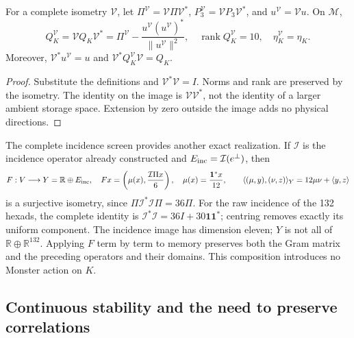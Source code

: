 \begin{proposition}
\label{lib01:transporte-direccion}
For a complete isometry \(\mathcal V\), let \(\Pi^{\mathcal V}=\mathcal V\Pi\mathcal V^*\), \(P_3^{\mathcal V}=\mathcal VP_3\mathcal V^*\), and \(u^{\mathcal V}=\mathcal Vu\). On \(\mathcal M\),
\[
 Q_K^{\mathcal V}
 =\mathcal VQ_K\mathcal V^*
 =\Pi^{\mathcal V}
 -\frac{u^{\mathcal V}(u^{\mathcal V})^*}{\|u^{\mathcal V}\|^2},
 \quad \operatorname{rank}Q_K^{\mathcal V}=10,
 \quad \eta_K^{\mathcal V}=\eta_K.
\]
Moreover, \(\mathcal V^*u^{\mathcal V}=u\) and \(\mathcal V^*Q_K^{\mathcal V}\mathcal V=Q_K\).
\end{proposition}
\begin{proof}
Substitute the definitions and \(\mathcal V^*\mathcal V=I\). Norms and rank are preserved by the isometry. The identity on the image is \(\mathcal V\mathcal V^*\), not the identity of a larger ambient storage space. Extension by zero outside the image adds no physical directions.
\end{proof}

The complete incidence screen provides another exact realization. If \(\mathcal I\) is the incidence operator already constructed and \(E_{\rm inc}=\mathcal I(e^\perp)\), then
\begin{equation}
 F:V\longrightarrow Y=\mathbb R\oplus E_{\rm inc},\quad
 Fx=\left(\mu(x),\frac{\mathcal I\Pi x}{6}\right),\quad
 \mu(x)=\frac{\mathbf1^*x}{12},\qquad
 \langle(\mu,y),(\nu,z)\rangle_Y=12\mu\nu+\langle y,z\rangle
 \label{lib01:incidencia-F}
\end{equation}
is a surjective isometry, since \(\Pi\mathcal I^*\mathcal I\Pi=36\Pi\). For the raw incidence of the 132 hexads, the complete identity is \(\mathcal I^*\mathcal I=36I+30\mathbf1\mathbf1^*\); centring removes exactly its uniform component. The incidence image has dimension eleven; \(Y\) is not all of \(\mathbb R\oplus\mathbb R^{132}\). Applying \(F\) term by term to memory preserves both the Gram matrix and the preceding operators and their domains. This composition introduces no Monster action on \(K\).

\subsection{Continuous stability and the need to preserve correlations}
\label{lib01:ruido}

